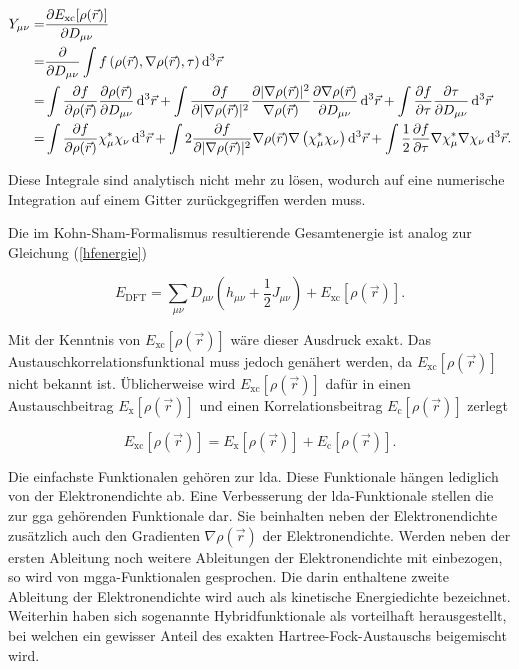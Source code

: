 \begin{equation}\label{ymunu}
\begin{aligned}
Y_{\mu\nu}=&\frac{\partial E_{\textrm{xc}}[\rho(\vec{r})]}{\partial D_{\mu\nu}}\\
=&\frac{\partial}{\partial D_{\mu\nu}} \int f\left(\rho(\vec{r}),\nabla\rho(\vec{r}),\tau\right) \mathop{}\!\mathrm{d^3} \vec{r}\\
=&\int\frac{\partial f}{\partial \rho(\vec{r})}\frac{\partial \rho(\vec{r})}{\partial D_{\mu\nu}}\mathop{}\!\mathrm{d^3}\vec{r}
+\int\frac{\partial f}{\partial \vert\nabla \rho(\vec{r})\vert^2}\frac{\partial \vert\nabla \rho(\vec{r})\vert^2}{\nabla \rho(\vec{r})}\frac{\partial \nabla \rho(\vec{r})}{\partial D_{\mu\nu}}\mathop{}\!\mathrm{d^3}\vec{r}
+\int\frac{\partial f}{\partial	\tau}\frac{\partial \tau}{\partial D_{\mu\nu}}\mathop{}\!\mathrm{d^3}\vec{r}\\
=&\int\frac{\partial f}{\partial \rho(\vec{r})}\chi_\mu^*\chi_\nu\mathop{}\!\mathrm{d^3}\vec{r}
+\int 2\frac{\partial f}{\partial \vert\nabla \rho(\vec{r})\vert^2}\nabla \rho(\vec{r})\nabla \left(\chi_\mu^*\chi_\nu\right)\mathop{}\!\mathrm{d^3}\vec{r}
+\int \frac{1}{2}\frac{\partial f}{\partial\tau}\nabla\chi_\mu^*\nabla\chi_\nu\mathop{}\!\mathrm{d^3}\vec{r}.
\end{aligned}
\end{equation}

Diese Integrale sind analytisch nicht mehr zu lösen, wodurch auf eine numerische Integration auf einem Gitter zurückgegriffen werden muss. 

Die im Kohn-Sham-Formalismus resultierende Gesamtenergie ist analog zur Gleichung (\ref{hfenergie})

\begin{equation}
E_{\textrm{DFT}}=\sum_{\mu\nu}D_{\mu\nu}(h_{\mu\nu}+\frac{1}{2}J_{\mu\nu})+E_{\textrm{xc}}[\rho(\vec{r})].
\label{dftenergie}
\end{equation}

Mit der Kenntnis von $E_{\textrm{xc}}[\rho(\vec{r})]$ wäre dieser Ausdruck exakt. Das Austauschkorrelationsfunktional muss jedoch genähert werden, da $E_{\textrm{xc}}[\rho(\vec{r})]$ nicht bekannt ist. Üblicherweise wird $E_{\textrm{xc}}[\rho(\vec{r})]$ dafür in einen Austauschbeitrag $E_{\textrm{x}}[\rho(\vec{r})]$ und einen Korrelationsbeitrag $E_{\textrm{c}}[\rho(\vec{r})]$ zerlegt

\begin{equation}
E_{\textrm{xc}}[\rho(\vec{r})] = E_{\textrm{x}}[\rho(\vec{r})] + E_{\textrm{c}}[\rho(\vec{r})].
\end{equation}

Die einfachste Funktionalen gehören zur \ac{lda}. Diese Funktionale hängen lediglich von der Elektronendichte ab. Eine Verbesserung der \ac{lda}-Funktionale stellen die zur \ac{gga} gehörenden Funktionale dar. Sie beinhalten neben der Elektronendichte zusätzlich auch den Gradienten $\nabla\rho(\vec{r})$ der Elektronendichte. Werden neben der ersten Ableitung noch weitere Ableitungen der Elektronendichte mit einbezogen, so wird von \ac{mgga}-Funktionalen gesprochen. Die darin enthaltene zweite Ableitung der Elektronendichte wird auch als kinetische Energiedichte bezeichnet. Weiterhin haben sich sogenannte Hybridfunktionale als vorteilhaft herausgestellt, bei welchen ein gewisser Anteil des exakten Hartree-Fock-Austauschs beigemischt wird.



